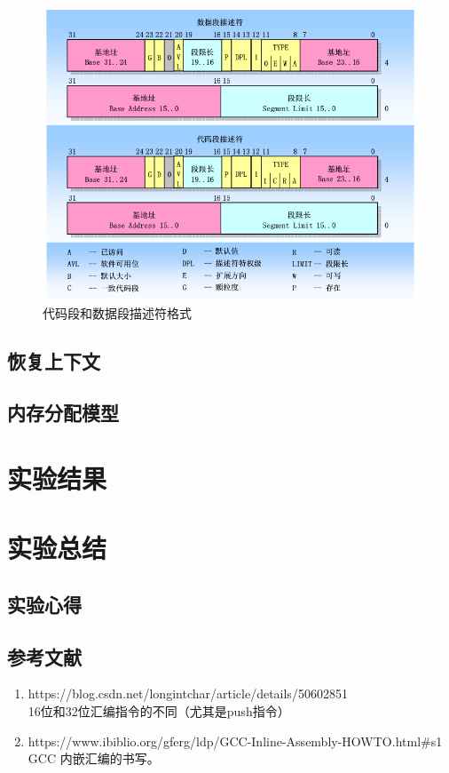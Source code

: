 \documentclass[a4paper]{article}
\begin{document}
        
        \begin{figure}
            \begin{center}
            \includegraphics[scale=0.6]{assets/segment.png}
            \caption{代码段和数据段描述符格式\label{fig:segment}} 
            \end{center} 
        \end{figure} 
        

    \subsection{恢复上下文}\label{sec:load}
    \subsection{内存分配模型}
\section{实验结果}
\section{实验总结}
    \subsection{实验心得}
\begin{appendices}
\section{参考文献} \label{sec:reference}
\begin{enumerate}
    \item https://blog.csdn.net/longintchar/article/details/50602851 \\
    16位和32位汇编指令的不同（尤其是push指令）
    \item https://www.ibiblio.org/gferg/ldp/GCC-Inline-Assembly-HOWTO.html\#s1 \\
    GCC 内嵌汇编的书写。
  \end{enumerate}
\end{appendices}
\end{document}
